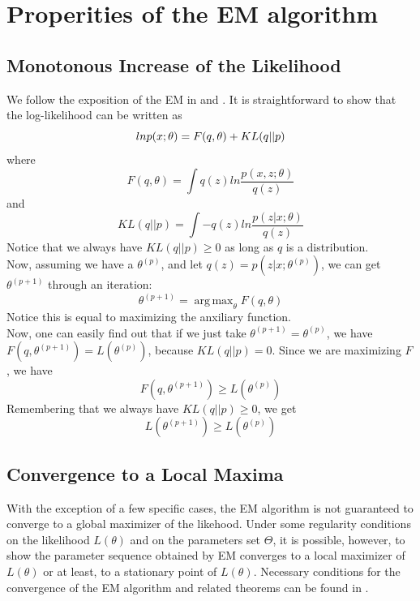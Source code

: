 \documentclass[11pt]{article}
\DeclareMathOperator*{\argmax}{arg\,max}
\begin{document}
\section{Properities of the EM algorithm}
\subsection{Monotonous Increase of the Likelihood}
We follow the exposition of the EM in \cite{PRML} and \cite{1998RM}. It is straightforward to show that the log-likelihood can be written as
\begin{equation}{\label{4}}
lnp(x;\theta)=F(q,\theta) + KL(q||p)
\end{equation}
where
\begin{equation}
F(q,\theta)=\int q(z)ln\frac{p(x,z;\theta)}{q(z)}
\end{equation}
and
\begin{equation}
KL(q||p)=\int -q(z)ln\frac{p(z|x;\theta)}{q(z)}
\end{equation}
Notice that we always have $KL(q||p) \geq 0$ as long as $q$ is a distribution.\\
Now, assuming we have a $\theta^{(p)}$, and let $q(z) = p(z|x;\theta^{(p)})$, we can get $\theta^{(p+1)}$ through an iteration:
\begin{equation}
\theta^{(p+1)} = \argmax_{\theta}F(q, \theta)
\end{equation}
Notice this is equal to maximizing the anxiliary function.\\
Now, one can easily find out that if we just take $\theta^{(p+1)}=\theta^{(p)}$, we have$F(q, \theta^{(p+1)}) = L(\theta^{(p)})$, because $KL(q||p)=0$. Since we are maximizing $F$, we have
\begin{equation}
F(q, \theta^{(p+1)}) \geq L(\theta^{(p)})
\end{equation}
Remembering that we always have $KL(q||p) \geq 0$, we get
\begin{equation}
L(\theta^{(p+1)}) \geq L(\theta^{(p)})
\end{equation}	
\subsection{Convergence to a Local Maxima}
With the exception of a few specific cases, the EM algorithm is not guaranteed to converge to a global maximizer of the likehood\cite{EMTour, Xu95onconvergence}. Under some regularity conditions on the likelihood $L(\theta)$ and on the parameters set $\Theta$, it is possible, however, to show the parameter sequence obtained by EM converges to a local maximizer of $L(\theta)$ or at least, to a stationary point of $L(\theta)$. Necessary conditions for the convergence of the EM algorithm and related theorems can be found in \cite{EMCov}.
\end{document}
